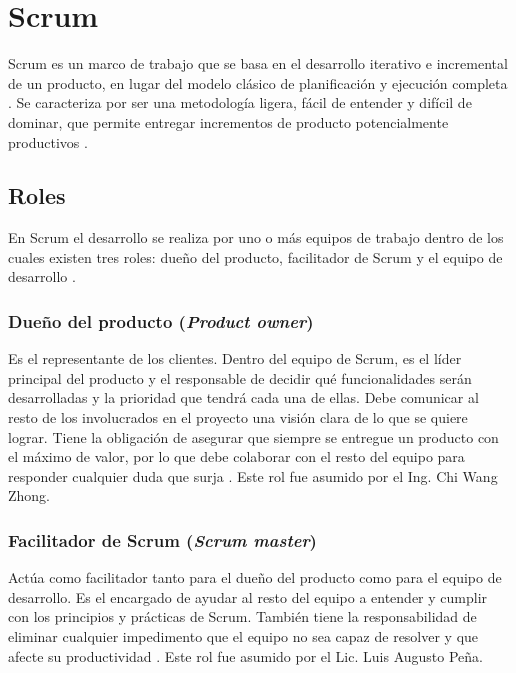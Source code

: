 \section{Scrum} \label{sect:Scrum}

Scrum es un marco de trabajo que se basa en el desarrollo iterativo e incremental de un producto, en lugar del modelo clásico de planificación y ejecución completa \cite{SCRM12}.  Se caracteriza por ser una metodología ligera, fácil de entender y difícil de dominar, que permite entregar incrementos de producto potencialmente productivos \cite{SCRM1}. 

\subsection{Roles} 

En Scrum el desarrollo se realiza por uno o más equipos de trabajo dentro de los cuales existen tres roles: dueño del producto, facilitador de Scrum y el equipo de desarrollo \cite{SCRM12}. 
 
\subsubsection{Dueño del producto (\textit{Product owner})}

Es el representante de los clientes. Dentro del equipo de Scrum, es el líder principal del producto y el responsable de decidir qué funcionalidades serán desarrolladas y la prioridad que tendrá cada una de ellas. Debe comunicar al resto de los involucrados en el proyecto una visión clara de lo que se quiere lograr. Tiene la obligación de asegurar que siempre se entregue un producto con el máximo de valor, por lo que debe colaborar con el resto del equipo para responder cualquier duda que surja \cite{SCRM12}. Este rol fue asumido por el Ing. Chi Wang Zhong.

\subsubsection{Facilitador de Scrum (\textit{Scrum master})}

Actúa como facilitador tanto para el dueño del producto como para el equipo de desarrollo. Es el encargado de ayudar al resto del equipo a entender y cumplir con los principios y prácticas de Scrum. También tiene la responsabilidad de eliminar cualquier impedimento que el equipo no sea capaz de resolver y que afecte su productividad \cite{SCRM12}. Este rol fue asumido por el Lic. Luis Augusto Peña.

